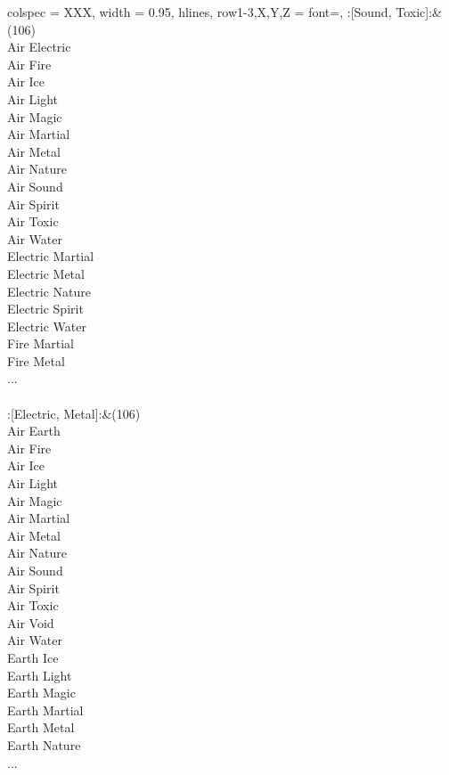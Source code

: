 \begin{longtblr}[
	caption = {2v2 Defending Weak},
	label = {2v2-Defending-Weak},
]{
	colspec = {XXX}, width = 0.95\linewidth,
	hlines,
	row{1-3,X,Y,Z} = {font=\bfseries},
}
	:[Sound, Toxic]:&{(106)\\
	Air Electric \\
	Air Fire \\
	Air Ice \\
	Air Light \\
	Air Magic \\
	Air Martial \\
	Air Metal \\
	Air Nature \\
	Air Sound \\
	Air Spirit \\
	Air Toxic \\
	Air Water \\
	Electric Martial \\
	Electric Metal \\
	Electric Nature \\
	Electric Spirit \\
	Electric Water \\
	Fire Martial \\
	Fire Metal \\
	...\\
	}\\

	:[Electric, Metal]:&{(106)\\
	Air Earth \\
	Air Fire \\
	Air Ice \\
	Air Light \\
	Air Magic \\
	Air Martial \\
	Air Metal \\
	Air Nature \\
	Air Sound \\
	Air Spirit \\
	Air Toxic \\
	Air Void \\
	Air Water \\
	Earth Ice \\
	Earth Light \\
	Earth Magic \\
	Earth Martial \\
	Earth Metal \\
	Earth Nature \\
	...\\
	}\\


\end{longtblr}
